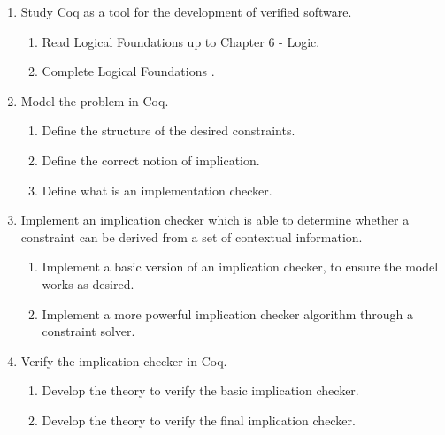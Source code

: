\begin{enumerate}
    \item Study Coq as a tool for the development of verified software. \\
    \begin{enumerate}[label={1.{\arabic*}.}]
        \item\label{task:1.1} Read Logical Foundations \cite{Pierce2017Logical} up to Chapter 6 - Logic.
        \item\label{task:1.2} Complete Logical Foundations \cite{Pierce2017Logical}.
    \end{enumerate}
    
    \item Model the problem in Coq.
    \begin{enumerate}[label={2.{\arabic*}.}]
        \item\label{task:2.1} Define the structure of the desired constraints.
        \item\label{task:2.2} Define the correct notion of implication.
        \item\label{task:2.3} Define what is an implementation checker.
    \end{enumerate}
    
    \item Implement an implication checker which is able to determine whether a constraint can be derived from a set of contextual information.
    \begin{enumerate}[label={3.{\arabic*}.}]
        \item\label{task:3.1} Implement a basic version of an implication checker, to ensure the model works as desired.
        \item\label{task:3.2} Implement a more powerful implication checker algorithm through a constraint solver.
    \end{enumerate}
    
    \item Verify the implication checker in Coq.
    \begin{enumerate}[label={4.{\arabic*}.}]
        \item\label{task:4.1} Develop the theory to verify the basic implication checker.
        \item\label{task:4.2} Develop the theory to verify the final implication checker.
    \end{enumerate}
\end{enumerate}

